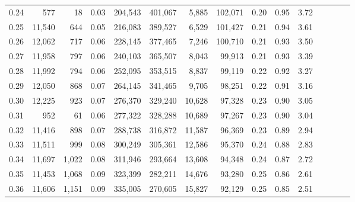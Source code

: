 \begin{tabular}{rrrcrrrrrrrrrrr}
0.24 &     577 &     18 &                                       0.03 &  204,543 &  401,067 &    5,885 &  102,071 &  0.20 &  0.95 &                         3.72 \\
0.25 &  11,540 &    644 &                                       0.05 &  216,083 &  389,527 &    6,529 &  101,427 &  0.21 &  0.94 &                         3.61 \\
0.26 &  12,062 &    717 &                                       0.06 &  228,145 &  377,465 &    7,246 &  100,710 &  0.21 &  0.93 &                         3.50 \\
0.27 &  11,958 &    797 &                                       0.06 &  240,103 &  365,507 &    8,043 &   99,913 &  0.21 &  0.93 &                         3.39 \\
0.28 &  11,992 &    794 &                                       0.06 &  252,095 &  353,515 &    8,837 &   99,119 &  0.22 &  0.92 &                         3.27 \\
0.29 &  12,050 &    868 &                                       0.07 &  264,145 &  341,465 &    9,705 &   98,251 &  0.22 &  0.91 &                         3.16 \\
0.30 &  12,225 &    923 &                                       0.07 &  276,370 &  329,240 &   10,628 &   97,328 &  0.23 &  0.90 &                         3.05 \\
0.31 &     952 &     61 &                                       0.06 &  277,322 &  328,288 &   10,689 &   97,267 &  0.23 &  0.90 &                         3.04 \\
0.32 &  11,416 &    898 &                                       0.07 &  288,738 &  316,872 &   11,587 &   96,369 &  0.23 &  0.89 &                         2.94 \\
0.33 &  11,511 &    999 &                                       0.08 &  300,249 &  305,361 &   12,586 &   95,370 &  0.24 &  0.88 &                         2.83 \\
0.34 &  11,697 &  1,022 &                                       0.08 &  311,946 &  293,664 &   13,608 &   94,348 &  0.24 &  0.87 &                         2.72 \\
0.35 &  11,453 &  1,068 &                                       0.09 &  323,399 &  282,211 &   14,676 &   93,280 &  0.25 &  0.86 &                         2.61 \\
0.36 &  11,606 &  1,151 &                                       0.09 &  335,005 &  270,605 &   15,827 &   92,129 &  0.25 &  0.85 &                         2.51 \\

\end{tabular}
